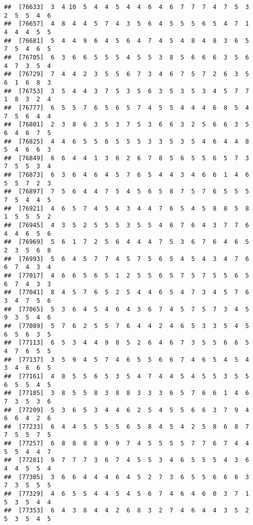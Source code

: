 \documentclass[
]{book}
\begin{document}
\begin{verbatim}
##  [76633]  3  4 10  5  4  4  5  4  4  6  4  6  7  7  7  4  7  5  3  2  5  5  4  6
##  [76657]  4  8  4  4  5  7  4  3  5  6  4  5  5  5  6  5  4  7  1  4  4  4  5  5
##  [76681]  5  4  4  9  6  4  5  6  4  7  4  5  4  8  4  8  3  6  5  7  5  4  6  5
##  [76705]  6  3  6  6  5  5  5  4  5  5  3  8  5  6  6  6  3  5  6  4  7  3  5  4
##  [76729]  7  4  4  2  3  5  5  6  7  3  4  6  7  5  7  2  6  3  5  6  1  6  8  3
##  [76753]  3  5  4  4  3  7  5  3  5  6  3  5  3  5  3  4  5  7  7  1  8  3  2  4
##  [76777]  6  5  5  7  6  5  6  5  7  4  5  5  4  4  4  6  8  5  4  7  5  6  4  4
##  [76801]  2  3  8  6  3  5  3  7  5  3  6  6  3  2  5  6  6  3  5  6  4  6  7  5
##  [76825]  4  4  6  5  5  6  5  5  5  3  3  5  3  5  4  6  4  4  8  5  4  6  6  3
##  [76849]  6  6  4  4  1  3  6  2  6  7  8  5  6  5  5  6  5  7  3  7  5  5  3  4
##  [76873]  6  3  6  4  6  4  5  7  6  5  4  4  3  4  6  6  1  4  6  5  5  7  2  3
##  [76897]  7  5  6  4  4  7  5  4  5  6  5  8  7  5  7  6  5  5  5  7  5  4  4  5
##  [76921]  4  6  5  7  4  5  4  3  4  4  7  6  5  4  5  8  8  5  8  1  5  5  5  2
##  [76945]  4  3  5  2  5  5  5  3  5  5  4  6  7  6  4  3  7  7  6  4  4  6  5  6
##  [76969]  5  6  1  7  2  5  6  4  4  4  7  5  3  6  7  6  4  6  5  2  3  5  6  8
##  [76993]  5  6  4  5  7  7  4  5  7  5  6  5  4  5  4  3  4  7  6  6  7  4  3  4
##  [77017]  4  6  6  5  6  5  1  2  5  5  6  5  7  5  7  5  5  6  5  6  7  4  3  3
##  [77041]  8  4  5  7  6  5  2  5  4  4  6  5  4  7  3  4  5  7  6  3  4  7  5  6
##  [77065]  5  3  6  4  5  4  6  4  3  6  7  4  5  7  5  7  3  4  5  9  3  5  4  6
##  [77089]  5  7  6  2  5  5  7  6  4  4  2  4  6  5  3  3  5  4  5  6  5  6  3  5
##  [77113]  6  5  3  4  4  9  8  5  2  6  4  6  7  3  5  5  6  6  5  4  7  6  5  5
##  [77137]  3  5  9  4  5  7  4  6  5  5  6  6  7  4  6  5  4  5  4  3  4  6  6  5
##  [77161]  4  8  5  5  6  5  3  5  4  7  4  4  5  4  5  5  3  5  5  6  5  5  4  5
##  [77185]  3  8  5  5  8  3  8  8  3  3  3  6  5  7  6  6  1  4  6  7  3  5  3  6
##  [77209]  5  3  6  5  3  4  4  6  2  5  4  5  5  6  6  3  7  9  4  6  6  4  2  6
##  [77233]  6  4  4  5  5  5  5  6  5  8  4  5  4  2  5  8  6  8  7  7  5  5  7  5
##  [77257]  6  8  8  8  8  9  9  7  4  5  5  5  5  7  7  6  7  4  4  5  5  4  4  7
##  [77281]  9  7  7  7  3  6  7  4  5  5  3  4  6  5  5  5  4  3  6  4  4  5  5  4
##  [77305]  3  6  6  4  4  4  6  4  5  2  7  3  6  5  5  6  6  6  3  7  3  5  5  5
##  [77329]  4  6  5  5  4  4  5  4  5  6  7  4  6  4  6  0  3  7  1  5  3  5  4  4
##  [77353]  6  4  3  8  4  4  2  6  8  3  2  7  4  6  4  4  3  5  2  5  3  5  4  5

\end{verbatim}
\end{document}
